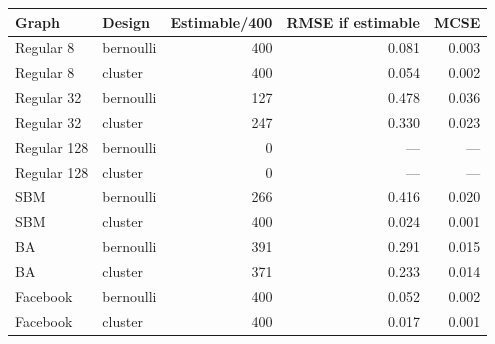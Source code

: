 \begin{tabular}{llrrr}
\toprule
Graph & Design & Estimable/400 & RMSE if estimable & MCSE \\
\midrule
Regular 8 & bernoulli & 400 & 0.081 & 0.003 \\
Regular 8 & cluster & 400 & 0.054 & 0.002 \\
Regular 32 & bernoulli & 127 & 0.478 & 0.036 \\
Regular 32 & cluster & 247 & 0.330 & 0.023 \\
Regular 128 & bernoulli & 0 & --- & --- \\
Regular 128 & cluster & 0 & --- & --- \\
SBM & bernoulli & 266 & 0.416 & 0.020 \\
SBM & cluster & 400 & 0.024 & 0.001 \\
BA & bernoulli & 391 & 0.291 & 0.015 \\
BA & cluster & 371 & 0.233 & 0.014 \\
Facebook & bernoulli & 400 & 0.052 & 0.002 \\
Facebook & cluster & 400 & 0.017 & 0.001 \\
\bottomrule
\end{tabular}